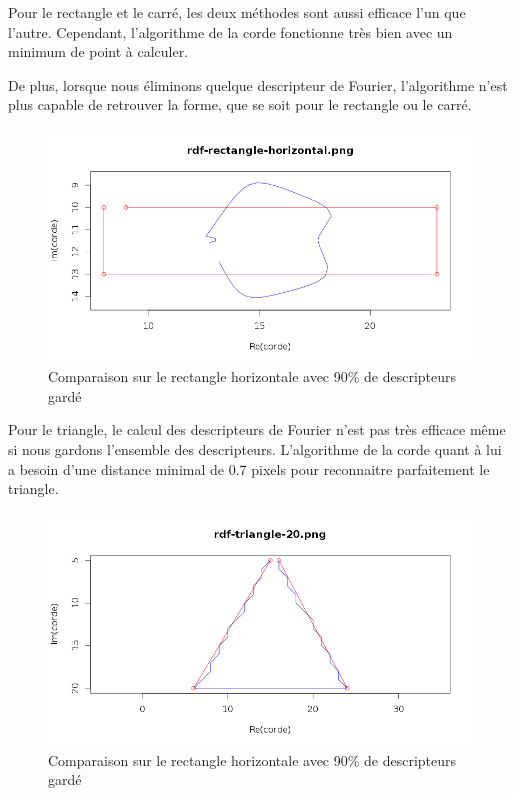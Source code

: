 \documentclass[11pt]{article}
\begin{document}
  \newpage
  Pour le rectangle et le carré, les deux méthodes sont aussi efficace l'un que l'autre. Cependant, l'algorithme de la corde
  fonctionne très bien avec un minimum de point à calculer.
  
  De plus, lorsque nous éliminons quelque descripteur de Fourier, l'algorithme n'est plus capable de 
  retrouver la forme, que se soit pour le rectangle ou le carré.\\
  
  \begin{center}
    \begin{figure}[!h]
      \includegraphics[width=15cm]{../resultat/comp_rate_rect.png}
      \caption{Comparaison sur le rectangle horizontale avec 90\% de descripteurs gardé}
    \end{figure}
  \end{center}
  
  Pour le triangle, le calcul des descripteurs de Fourier n'est pas très efficace même si nous gardons
  l'ensemble des descripteurs. L'algorithme de la corde quant à lui a besoin d'une distance minimal de 0.7 pixels pour
  reconnaitre parfaitement le triangle.
  
  \begin{center}
    \begin{figure}[!h]
      \includegraphics[width=15cm]{../resultat/comp_triangle.png}
      \caption{Comparaison sur le rectangle horizontale avec 90\% de descripteurs gardé}
    \end{figure}
  \end{center}
  
\end{document}
